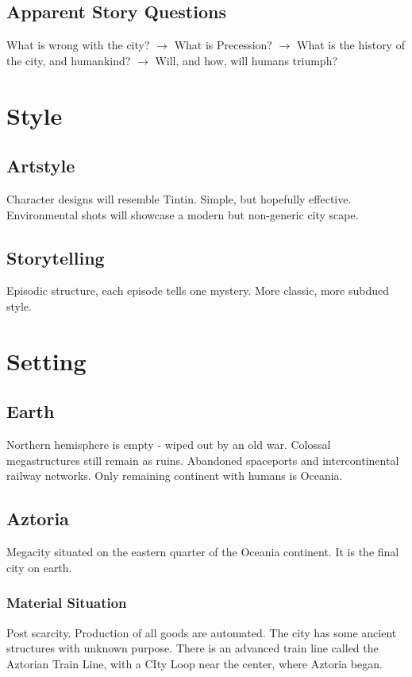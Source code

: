 \documentclass[11pt]{article}
\begin{document}
	\subsection{Apparent Story Questions}
	What is wrong with the city? $\rightarrow$ 
	What is Precession? $\rightarrow$  
	What is the history of the city, and humankind? $\rightarrow$ 
	Will, and how, will humans triumph?
\newpage






\section{Style}
	\subsection{Artstyle}
	Character designs will resemble Tintin. Simple, but hopefully effective.
	Environmental shots will showcase a modern but non-generic city scape.
	\subsection{Storytelling}
	Episodic structure, each episode tells one mystery. 
	More classic, more subdued style.
\newpage





\section{Setting}
	\subsection{Earth}
	Northern hemisphere is empty - wiped out by an old war.
	Colossal megastructures still remain as ruins.
	Abandoned spaceports and intercontinental railway networks.
	Only remaining continent with humans is Oceania.
	\subsection{Aztoria}
	Megacity situated on the eastern quarter of the Oceania continent. It is the final city on earth.
		\subsubsection{Material Situation}
		Post scarcity. Production of all goods are automated. 
		The city has some ancient structures with unknown purpose.
		There is an advanced train line called the Aztorian Train Line, with a CIty Loop near the center, where Aztoria began. 
\end{document}
